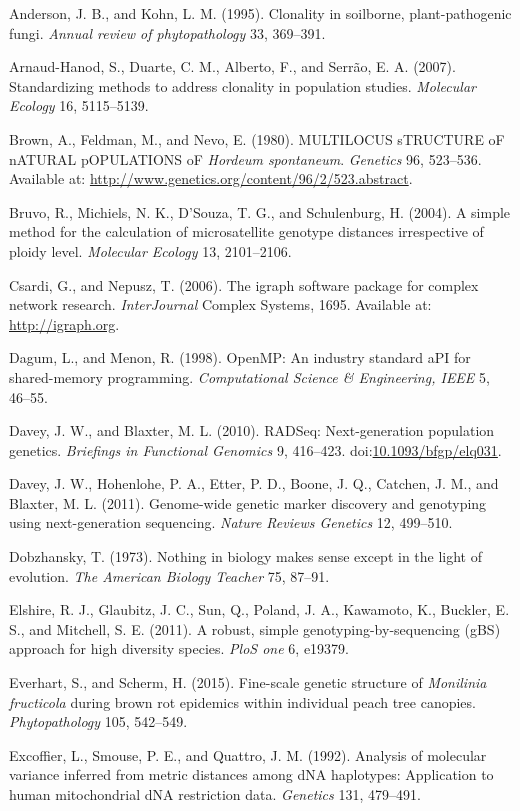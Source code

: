 \documentclass{frontiersSCNS} %
\begin{document}
Anderson, J. B., and Kohn, L. M. (1995). Clonality in soilborne,
plant-pathogenic fungi. \emph{Annual review of phytopathology} 33,
369--391.

Arnaud-Hanod, S., Duarte, C. M., Alberto, F., and Serr{ã}o, E. A.
(2007). Standardizing methods to address clonality in population
studies. \emph{Molecular Ecology} 16, 5115--5139.

Brown, A., Feldman, M., and Nevo, E. (1980). MULTILOCUS sTRUCTURE oF
nATURAL pOPULATIONS oF \emph{Hordeum spontaneum}. \emph{Genetics} 96,
523--536. Available at:
\url{http://www.genetics.org/content/96/2/523.abstract}.

Bruvo, R., Michiels, N. K., D'Souza, T. G., and Schulenburg, H. (2004).
A simple method for the calculation of microsatellite genotype distances
irrespective of ploidy level. \emph{Molecular Ecology} 13, 2101--2106.

Csardi, G., and Nepusz, T. (2006). The igraph software package for
complex network research. \emph{InterJournal} Complex Systems, 1695.
Available at: \url{http://igraph.org}.

Dagum, L., and Menon, R. (1998). OpenMP: An industry standard aPI for
shared-memory programming. \emph{Computational Science \& Engineering,
IEEE} 5, 46--55.

Davey, J. W., and Blaxter, M. L. (2010). RADSeq: Next-generation
population genetics. \emph{Briefings in Functional Genomics} 9,
416--423.
doi:\href{http://dx.doi.org/10.1093/bfgp/elq031}{10.1093/bfgp/elq031}.

Davey, J. W., Hohenlohe, P. A., Etter, P. D., Boone, J. Q., Catchen, J.
M., and Blaxter, M. L. (2011). Genome-wide genetic marker discovery and
genotyping using next-generation sequencing. \emph{Nature Reviews
Genetics} 12, 499--510.

Dobzhansky, T. (1973). Nothing in biology makes sense except in the
light of evolution. \emph{The American Biology Teacher} 75, 87--91.

Elshire, R. J., Glaubitz, J. C., Sun, Q., Poland, J. A., Kawamoto, K.,
Buckler, E. S., and Mitchell, S. E. (2011). A robust, simple
genotyping-by-sequencing (gBS) approach for high diversity species.
\emph{PloS one} 6, e19379.

Everhart, S., and Scherm, H. (2015). Fine-scale genetic structure of
\emph{Monilinia fructicola} during brown rot epidemics within individual
peach tree canopies. \emph{Phytopathology} 105, 542--549.

Excoffier, L., Smouse, P. E., and Quattro, J. M. (1992). Analysis of
molecular variance inferred from metric distances among dNA haplotypes:
Application to human mitochondrial dNA restriction data. \emph{Genetics}
131, 479--491.
\end{document}

